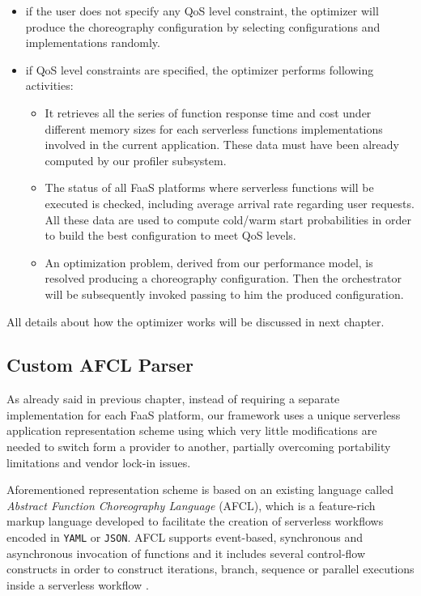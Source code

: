 \documentclass[12pt,a4paper]{report}
\begin{document}
\begin{itemize}
	\item if the user does not specify any QoS level constraint, the optimizer will produce the choreography configuration by selecting configurations and implementations randomly.
	
	\item if QoS level constraints are specified, the optimizer performs following activities:
	
	\begin{itemize}
		\item It retrieves all the series of function response time and cost under different memory sizes for each serverless functions implementations involved in the current application. These data must have been already computed by our profiler subsystem.
		
		\item The status of all FaaS platforms where serverless functions will be executed is checked, including average arrival rate regarding user requests. All these data are used to compute cold/warm start probabilities in order to build the best configuration to meet QoS levels.
		
		\item An optimization problem, derived from our performance model, is resolved producing a choreography configuration. Then the orchestrator will be subsequently invoked passing to him the produced configuration. 
			
	\end{itemize}

\end{itemize}

All details about how the optimizer works will be discussed in next chapter.

\subsection{Custom AFCL Parser}

As already said in previous chapter, instead of requiring a separate implementation for each FaaS platform, our framework uses a unique serverless application representation scheme using which very little modifications are needed to switch form a provider to another, partially overcoming portability limitations and vendor lock-in issues.

Aforementioned representation scheme is based on an existing language called \textit{Abstract Function Choreography Language} (AFCL), which is a feature-rich markup language developed to facilitate the creation of serverless workflows encoded in \texttt{YAML} or \texttt{JSON}. AFCL supports event-based, synchronous and asynchronous invocation of functions and it includes several control-flow constructs in order to construct iterations, branch, sequence or parallel executions inside a serverless workflow \cite{AFCL}.
\end{document}
